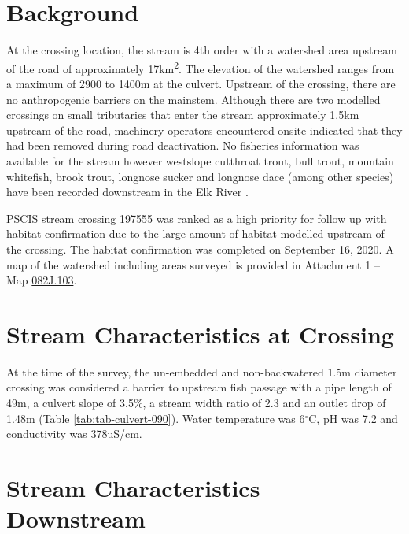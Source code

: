 \documentclass[
]{book}
\begin{document}
\hypertarget{background-8}{%
\section*{Background}\label{background-8}}

At the crossing location, the stream is 4th order with a watershed area upstream of the road of approximately 17km\textsuperscript{2}. The elevation of the watershed ranges from a maximum of 2900 to 1400m at the culvert. Upstream of the crossing, there are no anthropogenic barriers on the mainstem. Although there are two modelled crossings on small tributaries that enter the stream approximately 1.5km upstream of the road, machinery operators encountered onsite indicated that they had been removed during road deactivation. No fisheries information was available for the stream \citep{moeStreamInventorySample} however westslope cutthroat trout, bull trout, mountain whitefish, brook trout, longnose sucker and longnose dace (among other species) have been recorded downstream in the Elk River \citep{data_fish_obs}.

PSCIS stream crossing 197555 was ranked as a high priority for follow up with habitat confirmation due to the large amount of habitat modelled upstream of the crossing. The habitat confirmation was completed on September 16, 2020. A map of the watershed including areas surveyed is provided in Attachment 1 -- Map \url{082J.103}.

\hypertarget{stream-characteristics-at-crossing-7}{%
\section*{Stream Characteristics at Crossing}\label{stream-characteristics-at-crossing-7}}

At the time of the survey, the un-embedded and non-backwatered 1.5m diameter crossing was considered a barrier to upstream fish passage with a pipe length of 49m, a culvert slope of 3.5\%, a stream width ratio of 2.3 and an outlet drop of 1.48m (Table \ref{tab:tab-culvert-090}). Water temperature was 6\(^\circ\)C, pH was 7.2 and conductivity was 378uS/cm.

\hypertarget{stream-characteristics-downstream-5}{%
\section*{Stream Characteristics Downstream}\label{stream-characteristics-downstream-5}}
\end{document}
